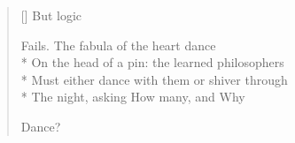 \label{ch:lear_bi}
\settowidth{\versewidth}{On the head of a pin: the learned philosophers}
\begin{verse}[\versewidth]
\hspace*{6\vgap} But logic

Fails. The fabula of the heart dance\\*
On the head of a pin: the learned philosophers\\*
Must either dance with them or shiver through\\*
The night, asking How many, and Why

Dance?
\end{verse}

